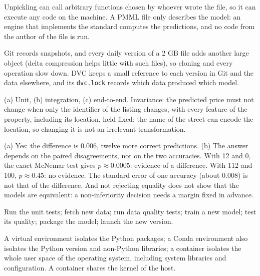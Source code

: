 \begin{description}[font=\bfseries,leftmargin=0pt,itemsep=5pt]
  \item[\ref{exr5:pickle}] Unpickling can call arbitrary functions chosen by whoever wrote the file, so it can
        execute any code on the machine. A PMML file only describes the model: an engine that implements the
        standard computes the predictions, and no code from the author of the file is run.
  \item[\ref{exr5:dvc}] Git records snapshots, and every daily version of a 2 GB file adds another large object
        (delta compression helps little with such files), so cloning and every operation slow down. DVC keeps a
        small reference to each version in Git and the data elsewhere, and its \texttt{dvc.lock} records which
        data produced which model.

  \item[\ref{exr5:tests}] (a) Unit, (b) integration, (c) end-to-end. Invariance: the predicted price must not change
        when only the identifier of the listing changes, with every feature of the property, including its
        location, held fixed; the name of the street can encode the location, so changing it is not an
        irrelevant transformation.
  \item[\ref{exr5:gate}] (a) Yes: the difference is 0.006, twelve more correct predictions. (b) The answer depends on
        the paired disagreements, not on the two accuracies. With 12 and 0, the exact McNemar test gives
        $p\approx0.0005$: evidence of a difference. With 112 and 100, $p\approx0.45$: no evidence. The standard error of
        one accuracy (about 0.008) is not that of the difference. And not rejecting equality does not show that
        the models are equivalent: a non-inferiority decision needs a margin fixed in advance.

  \item[\ref{exr5:order}] Run the unit tests; fetch new data; run data quality tests; train a new model; test its
        quality; package the model; launch the new version.
  \item[\ref{exr5:isolation}] A virtual environment isolates the Python packages; a Conda environment also isolates
        the Python version and non-Python libraries; a container isolates the whole user space of the operating
        system, including system libraries and configuration. A container shares the kernel of the host.


\end{description}
